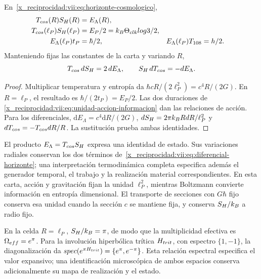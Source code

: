 \begin{theorem}
\label{x_reciprocidad:vii:thm:celda-media-accion}
En~\eqref{x_reciprocidad:vii:eq:horizonte-cosmologico},
\begin{align}
 T_{\rm cos}(R)S_{\rm H}(R)&=E_\Lambda(R),\\
 T_{\rm cos}(\ell_P)S_{\rm H}(\ell_P)
 &=\frac{E_P}{2}=\frac{k_B\Theta_{\rm clk}\log3}{2},\\
 E_\Lambda(\ell_P)t_P&=\frac{\hbar}{2},&
 E_\Lambda(\ell_P)T_{108}&=\frac h2.
 \label{x_reciprocidad:vii:eq:media-accion-horizonte}
\end{align}
Manteniendo fijas las constantes de la carta y variando \(R\),
\begin{equation}
 T_{\rm cos}\,\mathrm dS_{\rm H}=2\,\mathrm dE_\Lambda,
 \qquad S_{\rm H}\,\mathrm dT_{\rm cos}=-\mathrm dE_\Lambda.
 \label{x_reciprocidad:vii:eq:diferencial-horizonte}
\end{equation}
\end{theorem}
\begin{proof}
Multiplicar temperatura y entropía da
\(\hbar cR/(2\ell_P^2)=c^4R/(2G)\).
En \(R=\ell_P\), el resultado es
\(\hbar/(2t_P)=E_P/2\). Las dos duraciones de
\eqref{x_reciprocidad:vii:eq:unidad-accion-informacion} dan las relaciones de acción.
Para los diferenciales,
\(\mathrm dE_\Lambda=c^4\mathrm dR/(2G)\),
\(\mathrm dS_{\rm H}=2\pi k_BR\mathrm dR/\ell_P^2\) y
\(\mathrm dT_{\rm cos}=-T_{\rm cos}\mathrm dR/R\).
La sustitución prueba ambas identidades.
\end{proof}

El producto \(E_\Lambda=T_{\rm cos}S_{\rm H}\) expresa una
identidad de estado. Sus variaciones radiales conservan los dos términos
de~\eqref{x_reciprocidad:vii:eq:diferencial-horizonte}; una interpretación termodinámica
completa especifica además el generador temporal, el trabajo y la
realización material correspondientes. En esta carta, acción y
gravitación fijan la unidad \(\ell_P^2\), mientras Boltzmann convierte
información en entropía dimensional. El transporte de secciones con
\(G\hbar\) fijo conserva esa unidad cuando la sección \(c\) se
mantiene fija, y conserva \(S_{\rm H}/k_B\) a radio fijo.

En la celda \(R=\ell_P\), \(S_{\rm H}/k_B=\pi\), de modo que
la multiplicidad efectiva es \(\Omega_{\rm eff}=e^\pi\).
Para la involución hiperbólica trítica \(H_{\rm trit}\), con espectro
\(\{1,-1\}\), la diagonalización da
\(\operatorname{spec}(e^{\pi H_{\rm trit}})=\{e^\pi,e^{-\pi}\}\).
Esta relación espectral especifica el valor expansivo; una identificación
microscópica de ambos espacios conserva adicionalmente su mapa de
realización y el estado.

